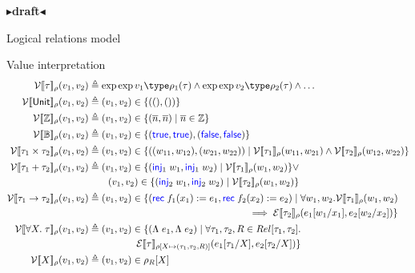\documentclass[twoside,11pt,openright]{report}
\theoremstyle{definition}
\newcommand{\Keyword}[1]{{\color{blue} \mathsf{#1}}}
\newcommand{\var}{x}
\newcommand{\expr}{e}
\newcommand{\val}{v}
\newcommand{\valB}{w}
\newcommand{\TT}{()}
\newcommand{\Num}[1]{\overline{#1}}
\newcommand{\True}{\Keyword{true}}
\newcommand{\False}{\Keyword{false}}
\newcommand{\Inj}[1]{\Keyword{inj}_{#1}\;}
\newcommand{\Tvar}{X}
\newcommand{\Tlam}{\Lambda\;}
\newcommand{\subst}[3]{#1{\left[#3 \middle/ #2 \right]}}
\newcommand{\Tunit}{\mathsf{Unit}}
\newcommand{\Tint}{\mathbb{Z}}
\newcommand{\Tbool}{\mathbb{B}}
\newcommand{\Tprod}[2]{#1 \times #2}
\newcommand{\Tsum}[2]{#1 + #2}
\newcommand{\Tfunc}[2]{#1 \rightarrow #2}
\newcommand{\Tall}[2]{\forall #1.\; #2}
\newcommand{\typ}{\tau}
\newcommand{\empvenv}{\bullet}
\newcommand{\emptenv}{\bullet}
\newcommand{\jdg}[4]{#1 \; | \; #2 \; \vdash #3 : #4}
\def\envs#1#2\exp#3\type#4{\jdg{#1}{#2}{#3}{#4}} %
\newcommand{\ValInp}[2]{\mathcal{V} \llbracket #1 \rrbracket_{#2}}
\newcommand{\ValInpGen}[2]{\ValInp{#1}{#2}(\val_1, \val_2)}
\newcommand{\ExpInp}[2]{\mathcal{E} \llbracket #1 \rrbracket_{#2}}
\newcommand{\map}[2]{#1 \mapsto #2}
\newcommand{\todo}[1]{{\color[rgb]{.5,0,0}\textbf{$\blacktriangleright$#1$\blacktriangleleft$}}}
\begin{document}
\todo{draft}

Logical relations model

Value interpretation
\begin{align*}
  \ValInpGen{\typ}{\rho}    &\triangleq \envs \emptenv \empvenv \exp \val_1 \type \rho_1(\typ) \land \envs \emptenv \empvenv \exp \val_2 \type \rho_2(\typ) \land \dots\\
  \ValInpGen{\Tunit}{\rho}  &\triangleq (\val_1, \val_2) \in \{(\TT, \TT)\}\\
  \ValInpGen{\Tint}{\rho}   &\triangleq (\val_1, \val_2) \in \{(\Num{n}, \Num{n}) \mid \Num{n} \in \Tint\}\\
  \ValInpGen{\Tbool}{\rho}  &\triangleq (\val_1, \val_2) \in \{(\True, \True), (\False, \False)\}\\
  \ValInpGen{\Tprod{\typ_1}{\typ_2}}{\rho}  &\triangleq (\val_1, \val_2) \in \{((\valB_{11}, \valB_{12}), (\valB_{21}, \valB_{22})) \mid \ValInp{\typ_1}{\rho}(\valB_{11}, \valB_{21}) \land \ValInp{\typ_2}{\rho}(\valB_{12}, \valB_{22})\}\\
  \ValInpGen{\Tsum{\typ_1}{\typ_2}}{\rho}   &\triangleq 
  \begin{aligned}[t]
    (\val_1, \val_2) \in \{(\Inj{1} \valB_1, \Inj{1} \valB_2) \mid \ValInp{\typ_1}{\rho}(\valB_1, \valB_2)\} \lor \\
    (\val_1, \val_2) \in \{(\Inj{2} \valB_1, \Inj{2} \valB_2) \mid \ValInp{\typ_2}{\rho}(\valB_1, \valB_2)\}
  \end{aligned}\\
  \ValInpGen{\Tfunc{\typ_1}{\typ_2}}{\rho}  &\triangleq 
  \begin{aligned}[t]
    (\val_1, \val_2) \in \{(\Rec f_1 \var_1 := \expr_1, \Rec f_2 \var_2 := \expr_2) \mid \forall \valB_1, \valB_2 . \ValInp{\typ_1}{\rho}(\valB_{1}, \valB_{2})\\
    \implies \ExpInp{\typ_2}{\rho}(\subst{\expr_1}{\var_1}{\valB_1}, \subst{\expr_2}{\var_2}{\valB_2})\}
  \end{aligned}\\
  \ValInpGen{\Tall{\Tvar}{\typ}}{\rho}  &\triangleq 
  \begin{aligned}[t]
    (\val_1, \val_2) \in \{(\Tlam \expr_1, \Tlam \expr_2) \mid \forall \typ_1, \typ_2, R \in Rel[\typ_1, \typ_2] .\\
    \ExpInp{\typ}{\rho[\map{\Tvar}{(\typ_1, \typ_2, R)}]}(\subst{\expr_1}{\Tvar}{\typ_1}, \subst{\expr_2}{\Tvar}{\typ_2})\}
  \end{aligned}\\
  \ValInpGen{\Tvar}{\rho} &\triangleq (\val_1, \val_2) \in \rho_R[\Tvar]\\
\end{align*}
\end{document}

